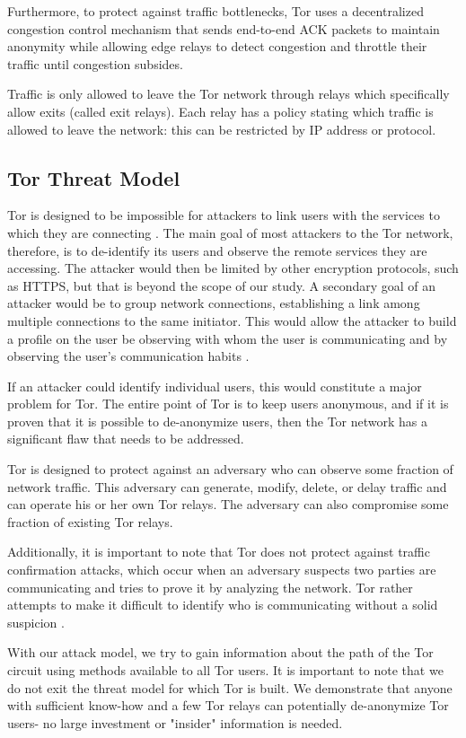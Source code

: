 \documentclass[12pt,journal]{IEEEtran}
\begin{document}
\par
Furthermore, to protect against traffic bottlenecks, Tor uses a decentralized congestion control mechanism that sends end-to-end ACK packets to maintain anonymity while allowing edge relays to detect congestion and throttle their traffic until congestion subsides.
\par
Traffic is only allowed to leave the Tor network through relays which specifically allow exits (called exit relays). Each relay has a policy stating which traffic is allowed to leave the network: this can be restricted by IP address or protocol. \cite{Dingledine:2004:TSO:1251375.1251396}

\subsection{Tor Threat Model}
Tor is designed to be impossible for attackers to link users with the services to which they are connecting \cite{Dingledine:2004:TSO:1251375.1251396}. The main goal of most attackers to the Tor network, therefore, is to de-identify its users and observe the remote services they are accessing. The attacker would then be limited by other encryption protocols, such as HTTPS, but that is beyond the scope of our study. A secondary goal of an attacker would be to group network connections, establishing a link among multiple connections to the same initiator. This would allow the attacker to build a profile on the user be observing with whom the user is communicating and by observing the user's communication habits \cite{Murdoch:2005:LTA:1058433.1059390}.
\par
If an attacker could identify individual users, this would constitute a major problem for Tor. The entire point of Tor is to keep users anonymous, and if it is proven that it is possible to de-anonymize users, then the Tor network has a significant flaw that needs to be addressed.
\par
Tor is designed to protect against an adversary who can observe some fraction of network traffic. This adversary can generate, modify, delete, or delay traffic and can operate his or her own Tor relays. The adversary can also compromise some fraction of existing Tor relays\cite{Dingledine:2004:TSO:1251375.1251396}.
\par
Additionally, it is important to note that Tor does not protect against traffic confirmation attacks, which occur when an adversary suspects two parties are communicating and tries to prove it by analyzing the network. Tor rather attempts to make it difficult to identify who is communicating without a solid suspicion \cite{Murdoch:2005:LTA:1058433.1059390}.
\par
With our attack model, we try to gain information about the path of the Tor circuit using methods available to all Tor users. It is important to note that we do not exit the threat model for which Tor is built. We demonstrate that anyone with sufficient know-how and a few Tor relays can potentially de-anonymize Tor users- no large investment or "insider" information is needed.
\end{document}
